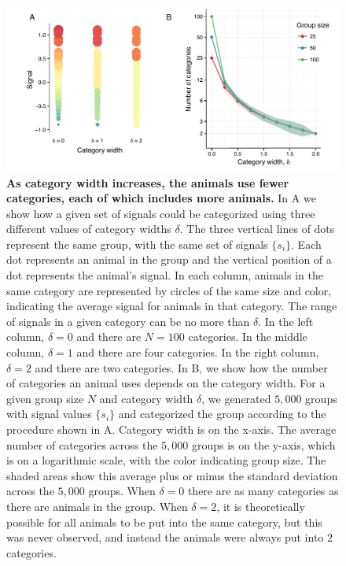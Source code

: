 \begin{figure}[ht]
\includegraphics[width=6.85in]{figures/category_diagram.pdf}
\caption{\sffamily\small\textbf{As category width increases, the animals use fewer categories, each of which includes more animals.} 
In A we show how a given set of signals could be categorized using three different values of category widths $\delta$. The three vertical lines of dots represent the same group, with the same set of signals $\{s_i\}$. Each dot represents an animal in the group and the vertical position of a dot represents the animal's signal. In each column, animals in the same category are represented by circles of the same size and color, indicating the average signal for animals in that category. The range of signals in a given category can be no more than $\delta$. In the left column, $\delta=0$ and there are $N=100$ categories. In the middle column, $\delta=1$ and there are four categories. In the right column, $\delta=2$ and there are two categories.  In B, we show how the number of categories an animal uses depends on the category width. For a given group size $N$ and category width $\delta$, we generated $5,000$ groups with signal values $\{s_i\}$ and categorized the group according to the procedure shown in A.  Category width is on the x-axis. The average number of categories across the $5,000$ groups is on the y-axis, which is on a logarithmic scale, with the color indicating group size. The shaded areas show this average plus or minus the standard deviation across the $5,000$ groups. When $\delta=0$ there are as many categories as there are animals in the group. When $\delta=2$, it is theoretically possible for all animals to be put into the same category, but this was never observed, and instead the animals were always put into $2$ categories. }
 \label{category_diagram}
\end{figure}


